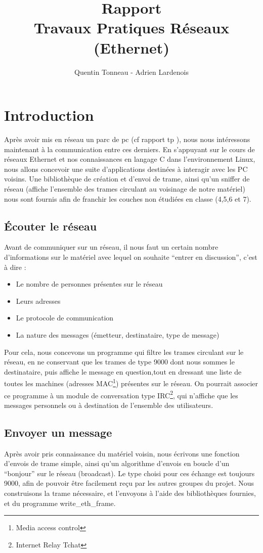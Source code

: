 \documentclass[a4paper,11pt]{article}
\title {Rapport \\ Travaux Pratiques Réseaux (Ethernet)}
\author {Quentin Tonneau - Adrien Lardenois}
\date{}
\begin{document}
	\maketitle %
	\tableofcontents %
	\newpage %
	
	
	
	
	
	
	\section{Introduction}
	Après avoir mis en réseau un parc de pc (cf rapport tp ), nous nous intéressons maintenant à la communication entre ces derniers. En s'appuyant sur le cours de réseaux Ethernet et nos connaissances en langage C dans l'environnement Linux, nous allons concevoir une suite d'applications destinées à interagir avec les PC voisins. Une bibliothèque de création et d'envoi de trame, ainsi qu'un sniffer de réseau (affiche l'ensemble des trames circulant au voisinage de notre matériel) nous sont fournis afin de franchir les couches non étudiées en classe (4,5,6 et 7).
	\subsection{Écouter le réseau}
	Avant de communiquer sur un réseau, il nous faut un certain nombre d'informations sur le matériel avec lequel on souhaite ``entrer en discussion'', c'est à dire :
	\begin{itemize}
		\item Le nombre de personnes présentes sur le réseau
		\item Leurs adresses
		\item Le protocole de communication
		\item La nature des messages (émetteur, destinataire, type de message)
	\end{itemize}
	Pour cela, nous concevons un programme qui filtre les trames circulant sur le réseau, en ne conservant que les trames de type 9000 dont nous sommes le destinataire, puis affiche le message en question,tout en dressant une liste de toutes les machines (adresses MAC\footnote{Media access control}) présentes sur le réseau. On pourrait associer ce programme à un module de conversation type IRC\footnote{Internet Relay Tchat}, qui n'affiche que les messages personnels ou à destination de l'ensemble des utilisateurs.
	\subsection{Envoyer un message}
	Après avoir pris connaissance du matériel voisin, nous écrivons une fonction d'envois de trame simple, ainsi qu'un algorithme d'envois en boucle d'un ``bonjour'' sur le réseau (broadcast). Le type choisi pour ces échange est toujours 9000, afin de pouvoir être facilement reçu par les autres groupes du projet. Nous construisons la trame nécessaire, et l'envoyons à l'aide des bibliothèques fournies, et du programme write\_eth\_frame.
\end{document}
